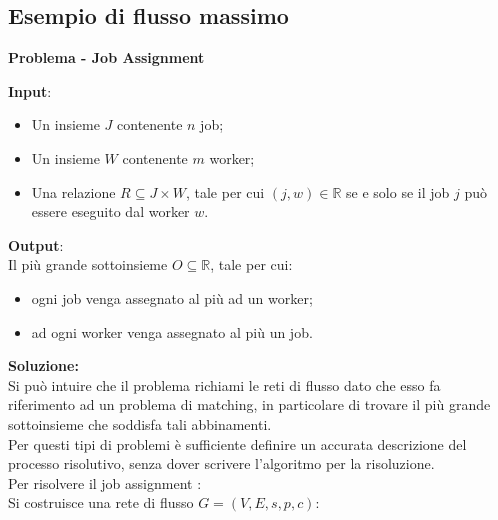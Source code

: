 \documentclass[../cheatSheetAlgoritmi.tex]{subfiles}
\begin{document}
\subsection{Esempio di flusso massimo}
\textbf{Problema - Job Assignment}

\bigskip
\textbf{Input}: 
\begin{itemize}
	\item Un insieme $J$ contenente $n$ job;
	\item Un insieme $W$ contenente $m$ worker;
	\item Una relazione $R \subseteq J \times W$, tale per cui $(j, w) \in \mathbb{R}$ se e solo se il job $j$ può essere eseguito dal worker $w$.
\end{itemize}
\textbf{Output}:\\
 Il più grande sottoinsieme $O \subseteq \mathbb{R}$, tale per cui:
\begin{itemize}
	\item ogni job venga assegnato al più ad un worker;
	\item ad ogni worker venga assegnato al più un job.
\end{itemize}
\textbf{Soluzione:} \\
Si può intuire che il problema richiami le reti di flusso dato che esso fa riferimento ad un problema di matching, in particolare di trovare il più grande sottoinsieme che soddisfa tali abbinamenti. \\
Per questi tipi di problemi è sufficiente definire un accurata descrizione del processo risolutivo, senza dover scrivere l'algoritmo per la risoluzione. \\
Per risolvere il job assignment :\\ 
Si costruisce una rete di flusso $G = (V, E, s, p, c)$:
\end{document}

